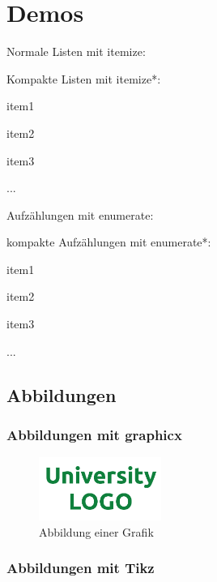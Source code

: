 \chapter{Demos}
\blindtext

\bigskip

Normale Listen mit itemize:
\blinditemize[4]


Kompakte Listen mit itemize*:
\begin{itemize*}
	\item item1
	\item item2
	\item item3
	\item ...
\end{itemize*}

Aufzählungen mit enumerate:
\blindenumerate

kompakte Aufzählungen mit enumerate*:
\begin{enumerate*}
	\item item1
	\item item2
	\item item3
	\item ...
\end{enumerate*}


\section{Abbildungen}

\subsection{Abbildungen mit graphicx}

\begin{figure}[H]
	\vspace{1em}
	\begin{center}
		\includegraphics[width=4cm]{img/unilogo.png}
	\end{center}
	\vspace{-1em}
	\caption{Abbildung einer Grafik}
	\label{fig:graphicx}
\end{figure}


\subsection{Abbildungen mit Tikz}

